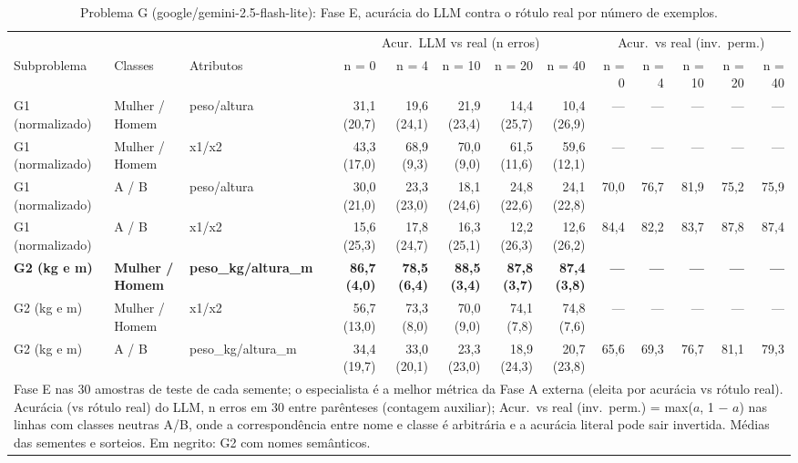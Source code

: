 \begin{table}[htbp]
\centering
\footnotesize
\caption{Problema G (google/gemini-2.5-flash-lite): Fase E, acurácia do LLM contra o rótulo real por número de exemplos.}
\label{tab:bloco3_G_faseE_nshot_flashlite}
\begin{tabular}{lllrrrrrrrrrr}
\toprule
 &  &  & \multicolumn{5}{c}{Acur.\ LLM vs real (n erros)} & \multicolumn{5}{c}{Acur.\ vs real (inv.\ perm.)} \\ \cmidrule(lr){4-8} \cmidrule(lr){9-13}
Subproblema & Classes & Atributos & n = 0 & n = 4 & n = 10 & n = 20 & n = 40 & n = 0 & n = 4 & n = 10 & n = 20 & n = 40 \\
\midrule
G1 (normalizado) & Mulher / Homem & peso/altura & 31,1 (20,7) & 19,6 (24,1) & 21,9 (23,4) & 14,4 (25,7) & 10,4 (26,9) & — & — & — & — & — \\
G1 (normalizado) & Mulher / Homem & x1/x2 & 43,3 (17,0) & 68,9 (9,3) & 70,0 (9,0) & 61,5 (11,6) & 59,6 (12,1) & — & — & — & — & — \\
G1 (normalizado) & A / B & peso/altura & 30,0 (21,0) & 23,3 (23,0) & 18,1 (24,6) & 24,8 (22,6) & 24,1 (22,8) & 70,0 & 76,7 & 81,9 & 75,2 & 75,9 \\
G1 (normalizado) & A / B & x1/x2 & 15,6 (25,3) & 17,8 (24,7) & 16,3 (25,1) & 12,2 (26,3) & 12,6 (26,2) & 84,4 & 82,2 & 83,7 & 87,8 & 87,4 \\
\textbf{G2 (kg e m)} & \textbf{Mulher / Homem} & \textbf{peso\_kg/altura\_m} & \textbf{86,7 (4,0)} & \textbf{78,5 (6,4)} & \textbf{88,5 (3,4)} & \textbf{87,8 (3,7)} & \textbf{87,4 (3,8)} & \textbf{—} & \textbf{—} & \textbf{—} & \textbf{—} & \textbf{—} \\
G2 (kg e m) & Mulher / Homem & x1/x2 & 56,7 (13,0) & 73,3 (8,0) & 70,0 (9,0) & 74,1 (7,8) & 74,8 (7,6) & — & — & — & — & — \\
G2 (kg e m) & A / B & peso\_kg/altura\_m & 34,4 (19,7) & 33,0 (20,1) & 23,3 (23,0) & 18,9 (24,3) & 20,7 (23,8) & 65,6 & 69,3 & 76,7 & 81,1 & 79,3 \\
\bottomrule
\multicolumn{13}{p{0.95\linewidth}}{\footnotesize Fase E nas 30 amostras de teste de cada semente; o especialista é a melhor métrica da Fase A externa (eleita por acurácia vs rótulo real). Acurácia (vs rótulo real) do LLM, n erros em 30 entre parênteses (contagem auxiliar); Acur.\ vs real (inv.\ perm.) = max($a$, 1 $-$ $a$) nas linhas com classes neutras A/B, onde a correspondência entre nome e classe é arbitrária e a acurácia literal pode sair invertida. Médias das sementes e sorteios. Em negrito: G2 com nomes semânticos.} \\
\end{tabular}
\end{table}

